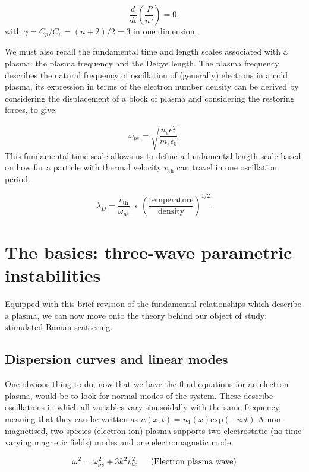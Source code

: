 \begin{equation}
\frac{d}{dt}\left(\frac{P}{n^{\gamma}}\right) = 0,
\end{equation} with $\gamma = C_p/C_v = (n+2)/2 = 3$ in one dimension. 

We must also recall the fundamental time and length scales associated with a plasma: the plasma frequency and the Debye length. The plasma frequency describes the natural frequency of oscillation of (generally) electrons in a cold plasma, its expression in terms of the electron number density can be derived by considering the displacement of a block of plasma and considering the restoring forces, to give:

\begin{equation}
	\omega_{pe} = \sqrt{\frac{n_e e^2}{m_e \epsilon_0}}.
\end{equation} This fundamental time-scale allows us to define a fundamental length-scale based on how far a particle with thermal velocity $v_{\text{th}}$ can travel in one oscillation period.

\begin{equation}
	\lambda_D = \frac{v_{\mathrm{th}}}{\omega_{pe}} \propto \left(\frac{\mathrm{temperature}}{\mathrm{density}}\right)^{1/2}.
\end{equation}\label{eqn:debye}

\section{The basics: three-wave parametric instabilities}
Equipped with this brief revision of the fundamental relationships which describe a plasma, we can now move onto the theory behind our object of study: stimulated Raman scattering.

\subsection{Dispersion curves and linear modes}

One obvious thing to do, now that we have the fluid equations for an electron plasma, would be to look for normal modes of the system. These describe oscillations in which all variables vary sinusoidally with the same frequency, meaning that they can be written as $n(x,t) = n_1(x)\text{exp}(-i\omega t)$
A non-magnetised, two-species (electron-ion) plasma supports two electrostatic (no time-varying magnetic fields) modes and one electromagnetic mode. 

\begin{equation}\label{eqn:bohm-gross}
	\omega^{2}=\omega_{p e}^{2}+3 k^{2} v_{\text{th}}^{2} \text{\,\,\,\,\,\,\,\,\,(Electron plasma wave)}
\end{equation}

